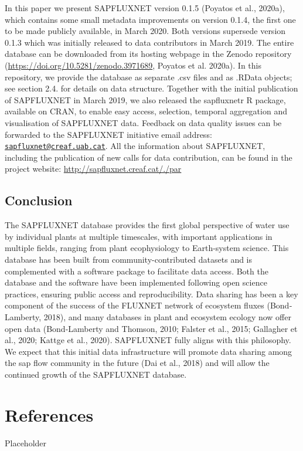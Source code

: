\documentclass[11pt,twoside]{reedthesis}
\begin{document}
In this paper we present SAPFLUXNET version 0.1.5 (Poyatos et al.,
2020a), which contains some small metadata improvements on version
0.1.4, the first one to be made publicly available, in March 2020. Both
versions supersede version 0.1.3 which was initially released to data
contributors in March 2019. The entire database can be downloaded from
its hosting webpage in the Zenodo repository
(\url{https://doi.org/10.5281/zenodo.3971689}, Poyatos et al. 2020a). In
this repository, we provide the database as separate .csv files and as
.RData objects; see section 2.4. for details on data structure. Together
with the initial publication of SAPFLUXNET in March 2019, we also
released the sapfluxnetr R package, available on CRAN, to enable easy
access, selection, temporal aggregation and visualisation of SAPFLUXNET
data. Feedback on data quality issues can be forwarded to the SAPFLUXNET
initiative email address:
\href{mailto:sapfluxnet@creaf.uab.cat}{\nolinkurl{sapfluxnet@creaf.uab.cat}}.
All the information about SAPFLUXNET, including the publication of new
calls for data contribution, can be found in the project website:
\url{http://sapfluxnet.creaf.cat/./par}

\section{Conclusion}\label{conclusion}

The SAPFLUXNET database provides the first global perspective of water
use by individual plants at multiple timescales, with important
applications in multiple fields, ranging from plant ecophysiology to
Earth-system science. This database has been built from
community-contributed datasets and is complemented with a software
package to facilitate data access. Both the database and the software
have been implemented following open science practices, ensuring public
access and reproducibility. Data sharing has been a key component of the
success of the FLUXNET network of ecosystem fluxes (Bond‐Lamberty,
2018), and many databases in plant and ecosystem ecology now offer open
data (Bond-Lamberty and Thomson, 2010; Falster et al., 2015; Gallagher
et al., 2020; Kattge et al., 2020). SAPFLUXNET fully aligns with this
philosophy. We expect that this initial data infrastructure will promote
data sharing among the sap flow community in the future (Dai et al.,
2018) and will allow the continued growth of the SAPFLUXNET database.

\chapter*{References}\label{references}

Placeholder


\end{document}
